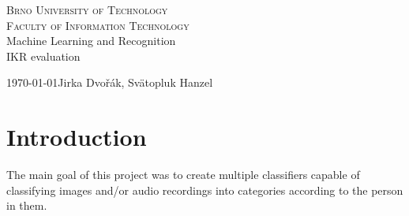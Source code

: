 \documentclass[11pt,a4paper]{article}
\begin{document}
\begin{titlepage}
	\begin{center}
	    {\LARGE\textsc{Brno University of Technology}}\\
	    \smallskip
	    {\Large\textsc{Faculty of Information Technology}}\\
	    \bigskip
	    \LARGE{Machine Learning and Recognition}\\
	    \smallskip
		\Huge{IKR evaluation}
	\end{center}
    {\today \hfill Jirka Dvořák, Svätopluk Hanzel}
\end{titlepage}

\section{Introduction}
	The main goal of this project was to create multiple classifiers capable of classifying images and/or audio recordings into categories according to the person in them.
\end{document}
